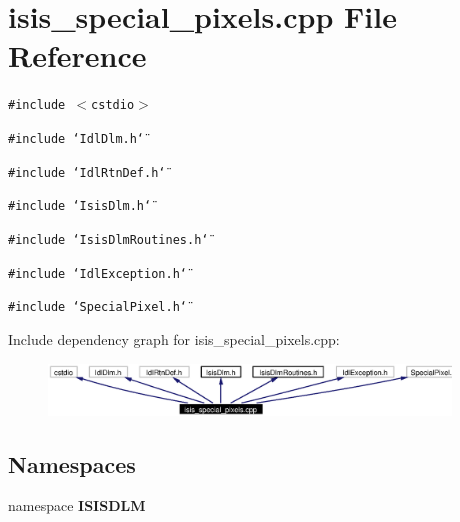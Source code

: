 \section{isis\_\-special\_\-pixels.cpp File Reference}
\label{isis__special__pixels_8cpp}
{\tt \#include $<$cstdio$>$}\par
{\tt \#include \char`\"{}Idl\-Dlm.h\char`\"{}}\par
{\tt \#include \char`\"{}Idl\-Rtn\-Def.h\char`\"{}}\par
{\tt \#include \char`\"{}Isis\-Dlm.h\char`\"{}}\par
{\tt \#include \char`\"{}Isis\-Dlm\-Routines.h\char`\"{}}\par
{\tt \#include \char`\"{}Idl\-Exception.h\char`\"{}}\par
{\tt \#include \char`\"{}Special\-Pixel.h\char`\"{}}\par


Include dependency graph for isis\_\-special\_\-pixels.cpp:\begin{figure}[H]
\begin{center}
\leavevmode
\includegraphics[width=303pt]{isis__special__pixels_8cpp__incl}
\end{center}
\end{figure}
\subsection*{Namespaces}
\begin{CompactItemize}
\item 
namespace {\bf ISISDLM}
\end{CompactItemize}
